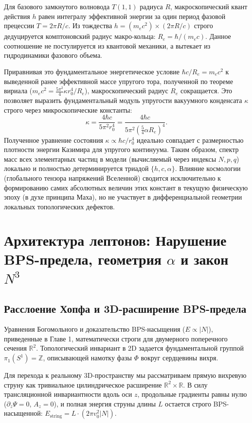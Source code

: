 \documentclass[12pt,a4paper]{article}
\begin{document}
Для базового замкнутого волновода $T(1,1)$ радиуса $R$, макроскопический квант действия $h$ равен интегралу эффективной энергии за один период фазовой прецессии $T = 2\pi R/c$. Из тождества $h = (m_e c^2) \times (2\pi R/c)$ строго дедуцируется комптоновский радиус макро-кольца: $R_e = \hbar / (m_e c)$. Данное соотношение не постулируется из квантовой механики, а вытекает из гидродинамики фазового объема.

Приравнивая это фундаментальное энергетическое условие $\hbar c / R_e = m_e c^2$ к выведенной ранее эффективной массе упругого тора, полученной по теореме вириала ($m_e c^2 = \frac{5\pi^2}{4} \kappa r_0^4 / R_e$), макроскопический радиус $R_e$ сокращается. Это позволяет выразить фундаментальный модуль упругости вакуумного конденсата $\kappa$ строго через микроскопические константы:
\begin{equation}
	\kappa = \frac{4 \hbar c}{5\pi^2 r_0^4} = \frac{4 \hbar c}{5\pi^2 \left( \frac{5}{4}\alpha R_e \right)^4}.
\end{equation}
Полученное уравнение состояния $\kappa \propto \hbar c / r_0^4$ идеально совпадает с размерностью плотности энергии Казимира для упругого континуума. 
Таким образом, спектр масс всех элементарных частиц в модели (вычисляемый через индексы $N, p, q$) локально и полностью детерминируется триадой $\{h, c, \alpha\}$. Влияние космологии (глобального тензора напряжений Вселенной) сводится исключительно к формированию самих абсолютных величин этих констант в текущую физическую эпоху (в духе принципа Маха), но не участвует в дифференциальной геометрии локальных топологических дефектов.
	
\section{Архитектура лептонов: Нарушение BPS-предела, геометрия $\alpha$ и закон $N^3$}
	
\subsection{Расслоение Хопфа и 3D-расширение BPS-предела}
Уравнения Богомольного и доказательство BPS-насыщения ($E \propto |N|$), приведенные в Главе 1, математически строги для двумерного поперечного сечения $\mathbb{R}^2$. Топологический инвариант в 2D задается фундаментальной группой $\pi_1(S^1) = \mathbb{Z}$, описывающей намотку фазы $\Phi$ вокруг сердцевины вихря. 

Для перехода к реальному 3D-пространству мы рассматриваем прямую вихревую струну как тривиальное цилиндрическое расширение $\mathbb{R}^2 \times \mathbb{R}$. В силу трансляционной инвариантности вдоль оси $z$, продольные градиенты равны нулю ($\partial_z \Psi = 0$, $A_z = 0$), и полная энергия струны длины $L$ остается строго BPS-насыщенной: $E_{\text{string}} = L \cdot (2\pi v_0^2 |N|)$. 
\end{document}
